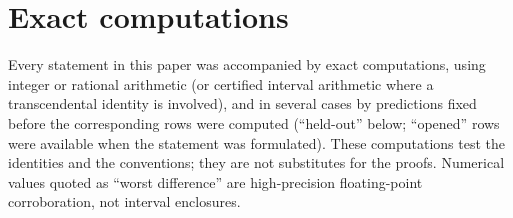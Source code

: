 \documentclass[11pt]{article}
\theoremstyle{definition}
\begin{document}
\appendix

\section{Exact computations}
\label{app:verification}

Every statement in this paper was accompanied by exact computations,
using integer or rational arithmetic (or certified interval arithmetic
where a transcendental identity is involved), and in several cases by
predictions fixed before the corresponding rows were computed
(``held-out'' below; ``opened'' rows were available when the statement
was formulated).  These computations test the identities and the
conventions; they are not substitutes for the proofs.  Numerical values
quoted as ``worst difference'' are high-precision floating-point
corroboration, not interval enclosures.
\end{document}
